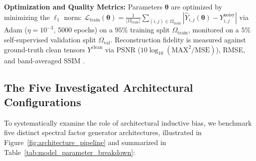 \textbf{Optimization and Quality Metrics:} Parameters $\boldsymbol{\theta}$ are optimized by minimizing the $\ell_1$ norm: $\mathcal{L}_\text{train}(\boldsymbol{\theta}) = \frac{1}{|\Omega_\text{train}|} \sum_{(i, j) \in \Omega_\text{train}} |\hat{Y}_{i, j}(\boldsymbol{\theta}) - Y^\text{noisy}_{i, j}|$ via Adam ($\eta = 10^{-3}$, 5000 epochs) on a $95\%$ training split $\Omega_\text{train}$, monitored on a $5\%$ self-supervised validation split $\Omega_\text{val}$. Reconstruction fidelity is measured against ground-truth clean tensors $Y^\text{clean}$ via PSNR ($10 \log_{10}(\text{MAX}^2/\text{MSE})$), RMSE, and band-averaged SSIM \citep{wang2004image}.

\subsection{The Five Investigated Architectural Configurations}
\label{subsec:five_models}
To systematically examine the role of architectural inductive bias, we benchmark five distinct spectral factor generator architectures, illustrated in Figure~\ref{fig:architecture_pipeline} and summarized in Table~\ref{tab:model_parameter_breakdown}:

